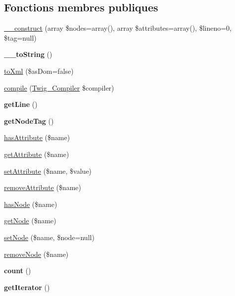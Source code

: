 \subsection*{Fonctions membres publiques}
\begin{DoxyCompactItemize}
\item 
\hyperlink{class_twig___node_a1aa1f1818967a7b79c84c6a2c795ccd8}{\+\_\+\+\_\+construct} (array \$nodes=array(), array \$attributes=array(), \$lineno=0, \$tag=null)
\item 
{\bfseries \+\_\+\+\_\+to\+String} ()\hypertarget{class_twig___node_a7516ca30af0db3cdbf9a7739b48ce91d}{}\label{class_twig___node_a7516ca30af0db3cdbf9a7739b48ce91d}

\item 
\hyperlink{class_twig___node_a8ef6547f4e489ba6353e4d96ec48e7a8}{to\+Xml} (\$as\+Dom=false)
\item 
\hyperlink{class_twig___node_a4e0faa87c3fae583620b84d3607085da}{compile} (\hyperlink{class_twig___compiler}{Twig\+\_\+\+Compiler} \$compiler)
\item 
{\bfseries get\+Line} ()\hypertarget{class_twig___node_aef9c32f6066788a101028a1d4150f8cb}{}\label{class_twig___node_aef9c32f6066788a101028a1d4150f8cb}

\item 
{\bfseries get\+Node\+Tag} ()\hypertarget{class_twig___node_ade3006d746f2e1ba1df08da2d613a632}{}\label{class_twig___node_ade3006d746f2e1ba1df08da2d613a632}

\item 
\hyperlink{class_twig___node_ac78ba27a41d0291c61326022489d4986}{has\+Attribute} (\$name)
\item 
\hyperlink{class_twig___node_ae954da422d40fc286691e54679e44c6f}{get\+Attribute} (\$name)
\item 
\hyperlink{class_twig___node_a545f43e4d937e0e272a4bafe8b411d55}{set\+Attribute} (\$name, \$value)
\item 
\hyperlink{class_twig___node_abbf04707cf678979459a4438e1450876}{remove\+Attribute} (\$name)
\item 
\hyperlink{class_twig___node_a4cc984156551609a68bf36368dca7f6b}{has\+Node} (\$name)
\item 
\hyperlink{class_twig___node_a071882cdcc51912c1025915e76680f42}{get\+Node} (\$name)
\item 
\hyperlink{class_twig___node_af59671ebefa5b3c066db692e05c80303}{set\+Node} (\$name, \$node=null)
\item 
\hyperlink{class_twig___node_a38ca670ed45c0c11aa8462f67f2ec7bd}{remove\+Node} (\$name)
\item 
{\bfseries count} ()\hypertarget{class_twig___node_ac751e87b3d4c4bf2feb03bee8b092755}{}\label{class_twig___node_ac751e87b3d4c4bf2feb03bee8b092755}

\item 
{\bfseries get\+Iterator} ()\hypertarget{class_twig___node_a7a9f937c2958e6f4dd7b030f86fb70b7}{}\label{class_twig___node_a7a9f937c2958e6f4dd7b030f86fb70b7}

\end{DoxyCompactItemize}
